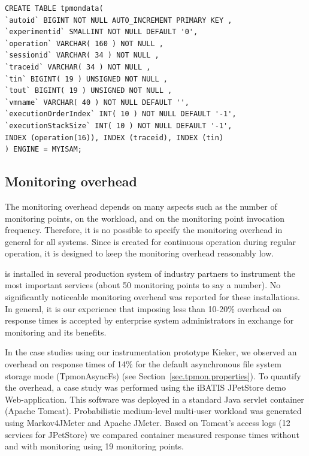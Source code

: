 \documentclass[a4paper,12pt]{scrartcl}
\begin{document}
\begin{lstlisting}[caption={SQL script for preparing the database table (mysql optimized)},label={OutputHelloWorld3}]
CREATE TABLE tpmondata(
`autoid` BIGINT NOT NULL AUTO_INCREMENT PRIMARY KEY ,
`experimentid` SMALLINT NOT NULL DEFAULT '0',
`operation` VARCHAR( 160 ) NOT NULL ,
`sessionid` VARCHAR( 34 ) NOT NULL ,
`traceid` VARCHAR( 34 ) NOT NULL ,
`tin` BIGINT( 19 ) UNSIGNED NOT NULL ,
`tout` BIGINT( 19 ) UNSIGNED NOT NULL ,
`vmname` VARCHAR( 40 ) NOT NULL DEFAULT '',
`executionOrderIndex` INT( 10 ) NOT NULL DEFAULT '-1',
`executionStackSize` INT( 10 ) NOT NULL DEFAULT '-1',
INDEX (operation(16)), INDEX (traceid), INDEX (tin)
) ENGINE = MYISAM;
\end{lstlisting}

\subsection{Monitoring overhead}
The monitoring overhead depends on many aspects such as the number of monitoring points, on the workload, and on the monitoring point invocation frequency. Therefore, it is no possible to specify the monitoring overhead in general for all systems. Since \tpmon{} is created for continuous operation during regular operation, it is designed to keep the monitoring
overhead reasonably low.

\tpmon{} is installed in several production system of industry partners to instrument the most important services (about 50 monitoring points to say a number). No significantly noticeable monitoring overhead was reported for these installations. In general, it is our experience that imposing less than 10-20\% overhead on response times is accepted by enterprise system administrators in exchange for monitoring and its benefits.

In the case studies using our instrumentation prototype Kieker, we observed an overhead on response times of 14\% for the default asynchronous file system storage mode (TpmonAsyncFs) (see Section~\ref{sec.tpmon.properties}). To quantify the overhead, a case study was performed using the iBATIS JPetStore demo Web-application. This software was deployed in a standard Java servlet container (Apache Tomcat). Probabilistic medium-level multi-user workload was generated using Markov4JMeter and Apache JMeter. Based on Tomcat's access logs (12 services for JPetStore) we compared container measured response times without and with \tpmon{} monitoring using 19 monitoring points.
\end{document}
